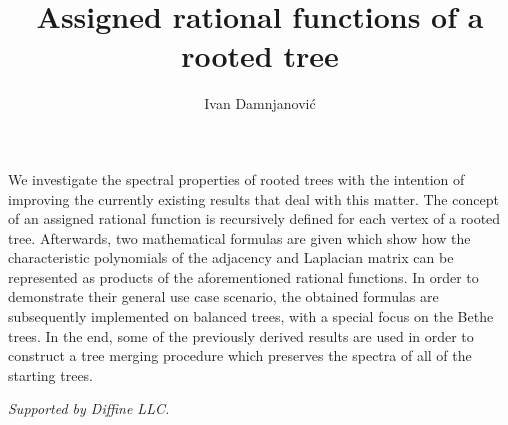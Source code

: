 \documentclass[a4paper]{amsart}
\date{}
\begin{document}
\title{Assigned rational functions of a rooted tree}
\author{Ivan Damnjanovi\'c} %
\address{Diffine LLC \& Faculty of Electronic Engineering, University of Ni\v{s}}

\maketitle


We investigate the spectral properties of rooted trees with the intention of improving the currently existing results that deal with this matter. The concept of an assigned rational function is recursively defined for each vertex of a rooted tree. Afterwards, two mathematical formulas are given which show how the characteristic polynomials of the adjacency and Laplacian matrix can be represented as products of the aforementioned rational functions. In order to demonstrate their general use case scenario, the obtained formulas are subsequently implemented on balanced trees, with a special focus on the Bethe trees. In the end, some of the previously derived results are used in order to construct a tree merging procedure which preserves the spectra of all of the starting trees.

\emph{Supported by Diffine LLC.}
\end{document}
